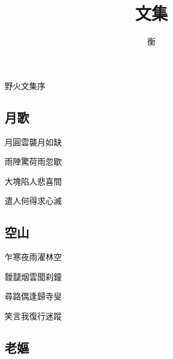 \documentclass[a4j,12pt]{ltjtarticle}
\title{文集}
\author{衡}
\begin{document}
	

	
	
	

	\Huge 野火文集序 \\
		
	\newpage
		
	\tableofcontents
	
	\newpage
	\begin{center}
	
		\begin{flushleft}
			\section{月歌} 
		\end{flushleft}
		
		
		
		\vfill
		\LARGE 	月圓雲襲月如缺 \par
		 		雨陣驚荷雨忽歇 \par
		 		大塊陷人悲喜間 \par
		 		遣人何得求心滅 \par
		\vspace{1cm} %
		\vfill
		
	\newpage
		\begin{flushleft}
			\section{空山}
		\end{flushleft}
		
		\vfill
		\LARGE 	乍寒夜雨濯林空 \par
				靉靆烟雲聞刹鐘 \par
				尋路偶逢歸寺叟 \par
				笑言我復行迷蹤 \par
		\vspace{0.5cm} %
		\vfill
		
		
	\newpage
	
		\begin{flushleft}
			\section{老嫗} 
		\end{flushleft}
		

\end{center}
\end{document}
